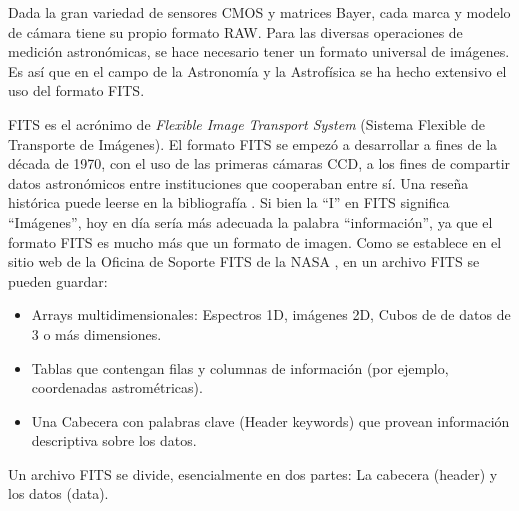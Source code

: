 \documentclass[a4paper, 12pt]{article}
\begin{document}
Dada la gran variedad de sensores CMOS y matrices Bayer, cada marca y modelo de cámara tiene su propio formato RAW. Para las diversas operaciones de medición astronómicas, se hace necesario tener un formato universal de imágenes. Es así que en el campo de la Astronomía y la Astrofísica se ha hecho extensivo el uso del formato FITS.

FITS es el acrónimo de {\it Flexible Image Transport System} (Sistema Flexible de Transporte de Imágenes). El formato FITS se empezó a desarrollar a fines de la década de 1970, con el uso de las primeras cámaras CCD, a los fines de compartir datos astronómicos entre instituciones que cooperaban entre sí. Una reseña histórica puede leerse en la bibliografía \cite{greisen}. Si bien la ``I'' en FITS significa ``Imágenes'', hoy en día sería más adecuada la palabra ``información'', ya que el formato FITS es mucho más que un formato de imagen. Como se establece en el sitio web de la Oficina de Soporte FITS de la NASA \cite{nasa}, en un archivo FITS se pueden guardar:

\begin{itemize}
  \item Arrays multidimensionales: Espectros 1D, imágenes 2D, Cubos de de datos de 3 o más dimensiones.
  \item Tablas que contengan filas y columnas de información (por ejemplo, coordenadas astrométricas).
  \item Una Cabecera con palabras clave (Header keywords) que provean información descriptiva sobre los datos.
\end{itemize}
  
  Un archivo FITS se divide, esencialmente en dos partes: La cabecera (header) y los datos (data).
\end{document}
